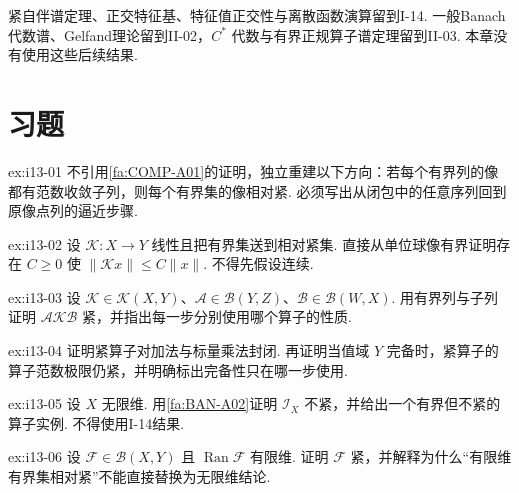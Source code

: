\begin{FARemark}[后续理论边界]
紧自伴谱定理、正交特征基、特征值正交性与离散函数演算留到I-14. 一般Banach代数谱、Gelfand理论留到II-02，\(\displaystyle C^*\) 代数与有界正规算子谱定理留到II-03. 本章没有使用这些后续结果.
\end{FARemark}

\section{习题}\label{sec:i13-exercises}

\begin{FAExercise}[紧性的序列判据]{ex:i13-01}
不引用\autoref{fa:COMP-A01}的证明，独立重建以下方向：若每个有界列的像都有范数收敛子列，则每个有界集的像相对紧. 必须写出从闭包中的任意序列回到原像点列的逼近步骤.
\end{FAExercise}

\begin{FAExercise}[紧线性映射自动连续]{ex:i13-02}
设 \(\displaystyle \mathcal K:X\to Y\) 线性且把有界集送到相对紧集. 直接从单位球像有界证明存在 \(\displaystyle C\geqslant0\) 使 \(\displaystyle \|\mathcal Kx\|\leqslant C\|x\|\). 不得先假设连续.
\end{FAExercise}

\begin{FAExercise}[两侧复合]{ex:i13-03}
设 \(\displaystyle \mathcal K\in\mathcal K(X,Y)\)、\(\displaystyle \mathcal A\in\mathcal B(Y,Z)\)、\(\displaystyle \mathcal B\in\mathcal B(W,X)\). 用有界列与子列证明 \(\displaystyle \mathcal A\mathcal K\mathcal B\) 紧，并指出每一步分别使用哪个算子的性质.
\end{FAExercise}

\begin{FAExercise}[线性封闭与范数极限]{ex:i13-04}
证明紧算子对加法与标量乘法封闭. 再证明当值域 \(\displaystyle Y\) 完备时，紧算子的算子范数极限仍紧，并明确标出完备性只在哪一步使用.
\end{FAExercise}

\begin{FAExercise}[无限维恒等算子]{ex:i13-05}
设 \(\displaystyle X\) 无限维. 用\autoref{fa:BAN-A02}证明 \(\displaystyle \mathcal I_X\) 不紧，并给出一个有界但不紧的算子实例. 不得使用I-14结果.
\end{FAExercise}

\begin{FAExercise}[有限秩紧性]{ex:i13-06}
设 \(\displaystyle \mathcal F\in\mathcal B(X,Y)\) 且 \(\displaystyle \operatorname{Ran}\mathcal F\) 有限维. 证明 \(\displaystyle \mathcal F\) 紧，并解释为什么“有限维有界集相对紧”不能直接替换为无限维结论.
\end{FAExercise}

